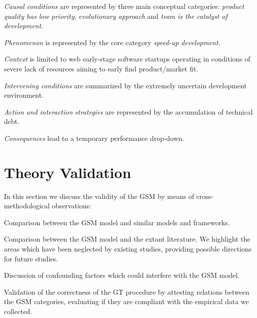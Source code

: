 \documentclass[10pt,journal,letterpaper,compsoc]{IEEEtran}
\begin{document}
\begin{compactitem}

\item \textit{Causal conditions} are represented by three main conceptual categories: \textit{product quality has low priority}, \textit{evolutionary approach} and \textit{team is the catalyst of development}.
\item \textit{Phenomenon} is represented by the core category \textit{speed-up development}.
\item \textit{Context} is limited to web early-stage software startups operating in conditions of severe lack of resources aiming to early find product/market fit.
\item \textit{Intervening conditions} are  summarized by the extremely uncertain development environment.
\item \textit{Action and interaction strategies} are represented by the accumulation of technical debt.
\item \textit{Consequences} lead to a temporary performance drop-down.
\end{compactitem}

\section{Theory Validation}
\label{res:val}

In this section we discuss the validity of the GSM by means of cross-methodological observations:

\begin{compactitem}
\item Comparison between the GSM model and similar  models and frameworks.

\item Comparison between the GSM model and the extant literature. We highlight the areas which have been neglected by existing studies, providing possible directions for future studies.
\item Discussion of confounding factors which could interfere with the GSM model.
\item Validation of the correctness of the GT procedure by attesting relations between the GSM categories, evaluating if they are compliant with the empirical data we collected.

\end{compactitem}
\end{document}
